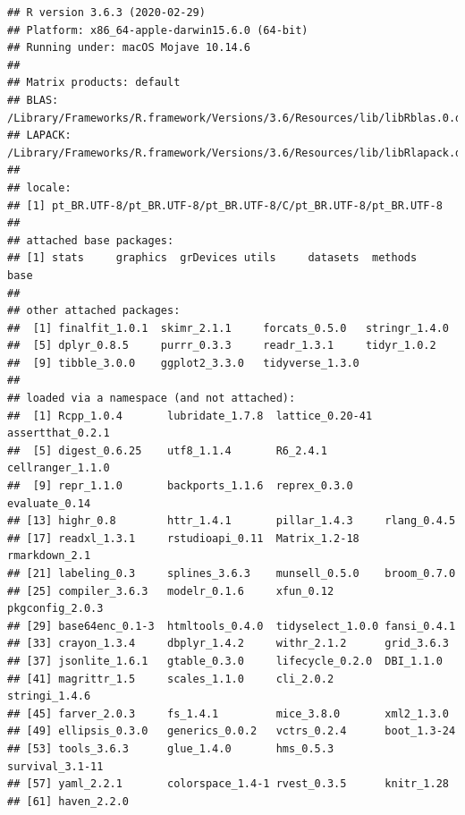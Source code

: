 \documentclass[]{article}
\begin{document}
\begin{verbatim}
## R version 3.6.3 (2020-02-29)
## Platform: x86_64-apple-darwin15.6.0 (64-bit)
## Running under: macOS Mojave 10.14.6
## 
## Matrix products: default
## BLAS:   /Library/Frameworks/R.framework/Versions/3.6/Resources/lib/libRblas.0.dylib
## LAPACK: /Library/Frameworks/R.framework/Versions/3.6/Resources/lib/libRlapack.dylib
## 
## locale:
## [1] pt_BR.UTF-8/pt_BR.UTF-8/pt_BR.UTF-8/C/pt_BR.UTF-8/pt_BR.UTF-8
## 
## attached base packages:
## [1] stats     graphics  grDevices utils     datasets  methods   base     
## 
## other attached packages:
##  [1] finalfit_1.0.1  skimr_2.1.1     forcats_0.5.0   stringr_1.4.0  
##  [5] dplyr_0.8.5     purrr_0.3.3     readr_1.3.1     tidyr_1.0.2    
##  [9] tibble_3.0.0    ggplot2_3.3.0   tidyverse_1.3.0
## 
## loaded via a namespace (and not attached):
##  [1] Rcpp_1.0.4       lubridate_1.7.8  lattice_0.20-41  assertthat_0.2.1
##  [5] digest_0.6.25    utf8_1.1.4       R6_2.4.1         cellranger_1.1.0
##  [9] repr_1.1.0       backports_1.1.6  reprex_0.3.0     evaluate_0.14   
## [13] highr_0.8        httr_1.4.1       pillar_1.4.3     rlang_0.4.5     
## [17] readxl_1.3.1     rstudioapi_0.11  Matrix_1.2-18    rmarkdown_2.1   
## [21] labeling_0.3     splines_3.6.3    munsell_0.5.0    broom_0.7.0     
## [25] compiler_3.6.3   modelr_0.1.6     xfun_0.12        pkgconfig_2.0.3 
## [29] base64enc_0.1-3  htmltools_0.4.0  tidyselect_1.0.0 fansi_0.4.1     
## [33] crayon_1.3.4     dbplyr_1.4.2     withr_2.1.2      grid_3.6.3      
## [37] jsonlite_1.6.1   gtable_0.3.0     lifecycle_0.2.0  DBI_1.1.0       
## [41] magrittr_1.5     scales_1.1.0     cli_2.0.2        stringi_1.4.6   
## [45] farver_2.0.3     fs_1.4.1         mice_3.8.0       xml2_1.3.0      
## [49] ellipsis_0.3.0   generics_0.0.2   vctrs_0.2.4      boot_1.3-24     
## [53] tools_3.6.3      glue_1.4.0       hms_0.5.3        survival_3.1-11 
## [57] yaml_2.2.1       colorspace_1.4-1 rvest_0.3.5      knitr_1.28      
## [61] haven_2.2.0
\end{verbatim}
\end{document}

